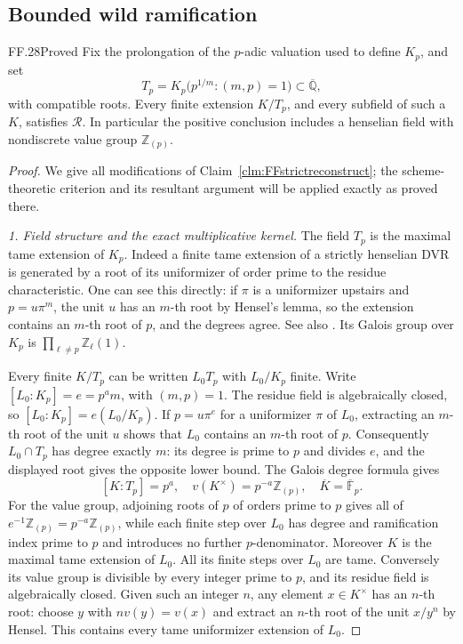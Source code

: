 \subsection{Bounded wild ramification}

\begin{claim}{FF.28}{Proved}\label{clm:FFtamereconstruct}
Fix the prolongation of the \(p\)-adic valuation used
to define \(K_p\), and set
\[
 T_p=K_p\bigl(p^{1/m}:(m,p)=1\bigr)
        \subset\overline{\mathbb Q},                    \tag{FF.28.1}
\]
with compatible roots. Every finite extension \(K/T_p\),
and every subfield of such a \(K\), satisfies
\(\mathcal R\). In particular the positive conclusion
includes a henselian field with nondiscrete value group
\(\mathbb Z_{(p)}\).
\end{claim}
\begin{proof}
We give all modifications of Claim~\ref{clm:FFstrictreconstruct};
the scheme-theoretic criterion and its resultant argument
will be applied exactly as proved there.

\emph{1. Field structure and the exact multiplicative kernel.}
The field \(T_p\) is the maximal tame extension of
\(K_p\). Indeed a finite tame extension of a strictly
henselian DVR is generated by a root of its uniformizer
of order prime to the residue characteristic. One can
see this directly: if \(\pi\) is a uniformizer upstairs
and \(p=u\pi^m\), the unit \(u\) has an \(m\)-th
root by Hensel's lemma, so the extension contains an
\(m\)-th root of \(p\), and the degrees agree.
See also \citep[Lemmas~15.116.2 and 15.116.7, Tags
09EV and 0EXW]{FF_StacksRamification}.
Its Galois group over \(K_p\) is
\(\prod_{\ell\ne p}\mathbb Z_\ell(1)\).

Every finite \(K/T_p\) can be written \(L_0T_p\)
with \(L_0/K_p\) finite. Write
\([L_0:K_p]=e=p^a m\), with \((m,p)=1\).
The residue field is algebraically closed, so
\([L_0:K_p]=e(L_0/K_p)\). If
\(p=u\pi^e\) for a uniformizer \(\pi\) of \(L_0\),
extracting an \(m\)-th root of the unit \(u\)
shows that \(L_0\) contains an \(m\)-th root of
\(p\). Consequently \(L_0\cap T_p\) has degree
exactly \(m\): its degree is prime to \(p\) and
divides \(e\), and the displayed root gives the
opposite lower bound. The Galois degree formula gives
\[
 [K:T_p]=p^a,
 \quad v(K^\times)=p^{-a}\mathbb Z_{(p)},
 \quad\overline K=\overline{\mathbb F}_p.              \tag{FF.28.2}
\]
For the value group, adjoining roots of \(p\) of
orders prime to \(p\) gives all of
\(e^{-1}\mathbb Z_{(p)}=p^{-a}\mathbb Z_{(p)}\),
while each finite step over \(L_0\) has degree and
ramification index prime to \(p\) and introduces
no further \(p\)-denominator.
Moreover \(K\) is the maximal tame extension of
\(L_0\). All its finite steps over \(L_0\) are tame.
Conversely its value group is divisible by every
integer prime to \(p\), and its residue field is
algebraically closed. Given such an integer \(n\),
any element \(x\in K^\times\) has an \(n\)-th root:
choose \(y\) with \(nv(y)=v(x)\) and extract an
\(n\)-th root of the unit \(x/y^n\) by Hensel.
This contains every tame uniformizer extension of
\(L_0\).


\end{proof}
